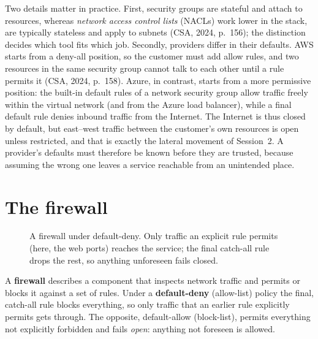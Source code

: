 Two details matter in practice. First, security groups are stateful
and attach to resources, whereas \emph{network access control lists} (NACLs)
work lower in the stack, are typically stateless and apply to subnets (CSA,
2024, p.~156); the distinction decides which tool fits which job. Secondly,
providers differ in their defaults. AWS starts from a deny-all position, so
the customer must add allow rules, and two resources in the same security
group cannot talk to each other until a rule permits it (CSA, 2024, p.~158).
Azure, in contrast, starts from a more permissive position: the built-in
default rules of a network security group allow traffic freely within the
virtual network (and from the Azure load balancer), while a final default
rule denies inbound traffic from the Internet. The Internet is thus closed
by default, but east--west traffic between the customer's own resources is
open unless restricted, and that is exactly the lateral movement of
Session~2. A provider's defaults must therefore be known before they are
trusted, because assuming the wrong one leaves a service reachable from an
unintended place.

\section{The firewall}

\begin{figure}[htbp]
\centering
{}
\caption{A firewall under default-deny. Only traffic an explicit rule permits
(here, the web ports) reaches the service; the final catch-all rule drops the
rest, so anything unforeseen fails closed.}
\label{fig:firewall}
\end{figure}

\begin{definition}\label{def:firewall}
A \textbf{firewall} describes a component that inspects network traffic and
permits or blocks it against a set of rules. Under a \textbf{default-deny}
(allow-list) policy the final, catch-all rule blocks everything, so only
traffic that an earlier rule explicitly permits gets through. The opposite,
default-allow (block-list), permits everything not explicitly forbidden and
fails \emph{open}: anything not foreseen is allowed.
\end{definition}

